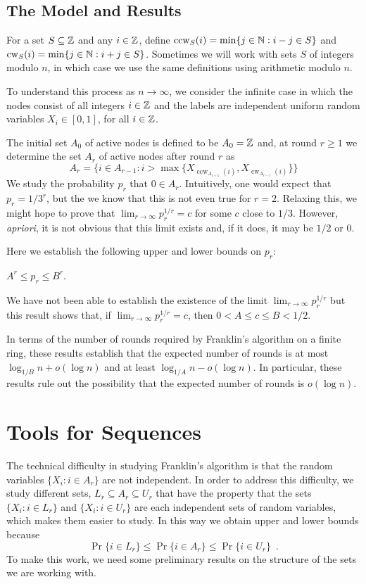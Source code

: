 \documentclass{patmorin}
\DeclareMathOperator{\cw}{cw}
\DeclareMathOperator{\ccw}{ccw}
\begin{document}
\subsection{The Model and Results}

For a set $S\subseteq\mathbb{Z}$ and any $i\in\mathbb{Z}$, define $\ccw_S(i) =
\min\{j\in\N: i-j\in S\}$ and $\cw_S(i) = \min\{j\in\N: i+j\in S\}$.
Sometimes we will work with sets $S$ of integers modulo $n$, in which
case we use the same definitions using arithmetic modulo $n$.

To understand this process as $n\to\infty$, we consider the infinite
case in which the nodes consist of all integers $i\in \mathbb{Z}$ and the labels are
independent uniform random variables $X_i\in[0,1]$, for all $i\in\mathbb{Z}$.

The initial set $A_0$ of active nodes is defined to be $A_0=\mathbb{Z}$ and, at round $r\ge 1$ we determine the set $A_r$ of active nodes after round $r$ as 
\[
    A_r = \{i \in A_{r-1} : i > \max\{X_{\ccw_{A_{r-1}}(i)},
                                      X_{\cw_{A_{r-1}}(i)}\} \} 
\] 
We study the probability $p_r$ that $0\in A_r$.  Intuitively, one would
expect that $p_r=1/3^r$, but the we know that this is not even true for
$r=2$.  Relaxing this, we might hope to prove that $\lim_{r\to\infty}
p_r^{1/r} = c$ for some $c$ close to $1/3$.  However, \emph{apriori}, it is not obvious that this limit exists and, if it does, it may be $1/2$ or $0$.

Here we establish the following upper and lower bounds on $p_r$:

\begin{thm}
   $A^r \le p_r \le B^r$.
\end{thm}

We have not been able to establish the existence of the limit
$\lim_{r\to\infty} p_r^{1/r}$ but this result shows that, if
$\lim_{r\to\infty} p_r^{1/r}=c$, then $0 < A \le c\le  B < 1/2$.

In terms of the number of rounds required by Franklin's algorithm on
a finite ring, these results establish that the expected number of
rounds is at most $\log_{1/B} n + o(\log n)$ and at least $\log_{1/A}
n- o(\log n)$.  In particular, these results rule out the possibility
that the expected number of rounds is $o(\log n)$.

\section{Tools for Sequences}

The technical difficulty in studying Franklin's algorithm is that the
random variables $\{X_i:i\in A_r\}$ are not independent.  In order to
address this difficulty, we study different sets, $L_r\subseteq
A_r\subseteq U_r$ that have the property that the sets $\{X_i:i\in L_r\}$
and $\{X_i:i\in U_r\}$ are each independent sets of random variables, which
makes them easier to study. In this way we obtain upper and lower bounds because
\[
    \Pr\{i\in L_r\} \le \Pr\{i\in A_r\} \le \Pr\{i\in U_r\} \enspace .
\]
To make this work, we need some preliminary results on the structure of
the sets we are working with.
\end{document}
